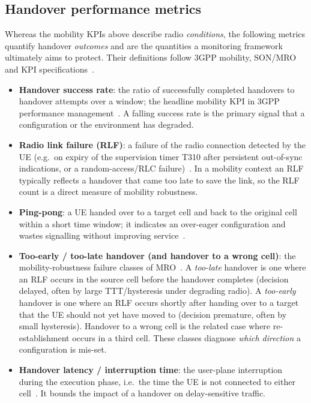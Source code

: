 \subsection{Handover performance metrics}
\label{subsec:ho-performance}

Whereas the mobility KPIs above describe radio \emph{conditions}, the following
metrics quantify handover \emph{outcomes} and are the quantities a monitoring
framework ultimately aims to protect. Their definitions follow 3GPP mobility,
SON/MRO and KPI specifications~\cite{ts38300,tr36839,ts28313,ts28554}.

\begin{itemize}
  \item \textbf{Handover success rate}: the ratio of successfully completed
  handovers to handover attempts over a window; the headline mobility KPI in
  3GPP performance management~\cite{ts28554}. A falling success rate is the
  primary signal that a configuration or the environment has degraded.
  \item \textbf{Radio link failure (RLF)}: a failure of the radio connection
  detected by the UE (e.g.\ on expiry of the supervision timer T310 after
  persistent out-of-sync indications, or a random-access/RLC failure)~\cite{ts38331,ts38133}.
  In a mobility context an RLF typically reflects a handover that came too late
  to save the link, so the RLF count is a direct measure of mobility robustness.
  \item \textbf{Ping-pong}: a UE handed over to a target cell and back to the
  original cell within a short time window; it indicates an over-eager
  configuration and wastes signalling without improving service~\cite{tr36839,ts28313}.
  \item \textbf{Too-early / too-late handover (and handover to a wrong cell)}:
  the mobility-robustness failure classes of MRO~\cite{tr36839,ts28313}. A
  \emph{too-late} handover is one where an RLF occurs in the source cell before
  the handover completes (decision delayed, often by large TTT/hysteresis under
  degrading radio). A \emph{too-early} handover is one where an RLF occurs
  shortly after handing over to a target that the UE should not yet have moved to
  (decision premature, often by small hysteresis). Handover to a wrong cell is
  the related case where re-establishment occurs in a third cell. These classes
  diagnose \emph{which direction} a configuration is mis-set.
  \item \textbf{Handover latency / interruption time}: the user-plane
  interruption during the execution phase, i.e.\ the time the UE is not connected
  to either cell~\cite{ts38300,ts38133}. It bounds the impact of a handover on
  delay-sensitive traffic.
\end{itemize}
